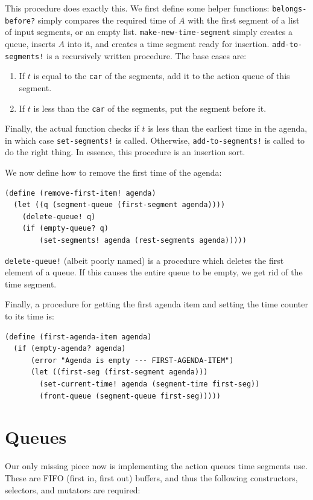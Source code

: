 \documentclass[9pt]{report}
\begin{document}
This procedure does exactly this. We first define some helper
functions: \texttt{belongs-before?} simply compares the required time of
\(A\) with the first segment of a list of input segments, or an
empty list. \texttt{make-new-time-segment} simply creates a queue,
inserts \(A\) into it, and creates a time segment ready for
insertion. \texttt{add-to-segments!} is a recursively written procedure.
The base cases are:
\begin{enumerate}
\item If \(t\) is equal to the \texttt{car} of the segments, add it to the
action queue of this segment.
\item If \(t\) is less than the \texttt{car} of the segments, put the segment
before it.
\end{enumerate}
Finally, the actual function checks if \(t\) is less than the
earliest time in the agenda, in which case \texttt{set-segments!} is
called. Otherwise, \texttt{add-to-segments!} is called to do the right
thing. In essence, this procedure is an insertion sort.

We now define how to remove the first time of the agenda:

\begin{verbatim}
(define (remove-first-item! agenda)
  (let ((q (segment-queue (first-segment agenda))))
    (delete-queue! q)
    (if (empty-queue? q)
        (set-segments! agenda (rest-segments agenda)))))
\end{verbatim}


\texttt{delete-queue!} (albeit poorly named) is a procedure which deletes
the first element of a queue. If this causes the entire queue to
be empty, we get rid of the time segment.

Finally, a procedure for getting the first agenda item and setting
the time counter to its time is:

\begin{verbatim}
(define (first-agenda-item agenda)
  (if (empty-agenda? agenda)
      (error "Agenda is empty --- FIRST-AGENDA-ITEM")
      (let ((first-seg (first-segment agenda)))
        (set-current-time! agenda (segment-time first-seg))
        (front-queue (segment-queue first-seg)))))
\end{verbatim}

\section{Queues}
\label{sec:orgd577836}

Our only missing piece now is implementing the action queues time
segments use. These are FIFO (first in, first out) buffers, and
thus the following constructors, selectors, and mutators are
required:
\end{document}

